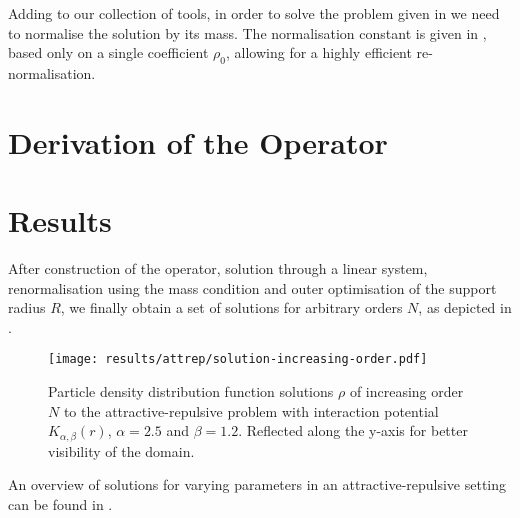 



Adding to our collection of tools, in order to solve the problem given in  we need to normalise the solution by its mass.
The normalisation constant is given in , based only on a single coefficient $\rho_0$, allowing for a highly efficient re-normalisation.


\pagebreak
\section{Derivation of the Operator}




\pagebreak


\section{Results}
After construction of the operator, solution through a linear system, renormalisation using the mass condition and outer optimisation of the support radius $R$, we finally obtain a set of solutions for arbitrary orders $N$, as depicted in .

\begin{figure}[H]
  \centering
  \texttt{[image: results/attrep/solution-increasing-order.pdf]}
  \caption[Solutions of increasing orders]{Particle density distribution function solutions $\rho$ of increasing order $N$ to the attractive-repulsive problem with interaction potential $K_{\alpha, \beta}(r)$, $\alpha = 2.5$ and $\beta = 1.2$. Reflected along the y-axis for better visibility of the domain.}
  \label{fig:solution-increasing-order}
\end{figure}

An overview of solutions for varying parameters in an attractive-repulsive setting can be found in .

